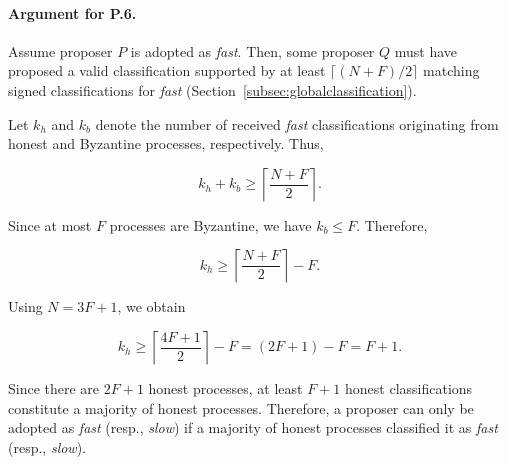 \paragraph{Argument for P.6.}
Assume proposer $P$ is adopted as \textit{fast}. 
Then, some proposer $Q$ must have proposed a valid classification supported by at least $\lceil (N+F)/2 \rceil$ matching signed classifications for \textit{fast} (Section~\ref{subsec:globalclassification}).

Let $k_h$ and $k_b$ denote the number of received \textit{fast} classifications originating from honest and Byzantine processes, respectively.
Thus,

\[
k_h + k_b \geq \left\lceil \frac{N+F}{2} \right\rceil.
\]

Since at most $F$ processes are Byzantine, we have $k_b \leq F$. Therefore,

\[
k_h
\geq
\left\lceil \frac{N+F}{2} \right\rceil - F.
\]

Using $N = 3F+1$, we obtain

\[
k_h
\geq
\left\lceil \frac{4F+1}{2} \right\rceil - F
=
(2F+1)-F
=
F+1.
\]

Since there are $2F+1$ honest processes, at least $F+1$ honest classifications constitute a majority of honest processes. 
Therefore, a proposer can only be adopted as \textit{fast} (resp., \textit{slow}) if a majority of honest processes classified it as \textit{fast} (resp., \textit{slow}).

